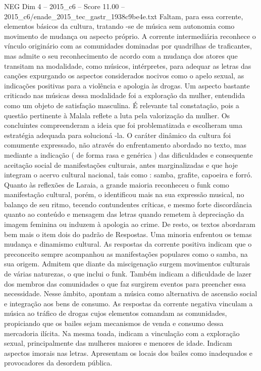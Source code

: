 \begin{textsample}{NEG Dim 4 – 2015\_c6 – Score 11.00 – 2015\_c6/enade\_2015\_tec\_gastr\_1938c9be4e.txt}
Faltam, para essa corrente, elementos básicos da cultura, tratando -se de música sem autonomia como movimento de mudança ou aspecto próprio.
A corrente intermediária reconhece o vínculo originário com as comunidades dominadas por quadrilhas de traficantes, mas admite o seu reconhecimento de acordo com a mudança dos atores que transitam na modalidade, como músicos, intérpretes, para adequar as letras das canções expurgando os aspectos considerados nocivos como o apelo sexual, as indicações positivas para a violência e apologia às drogas.
Um aspecto bastante criticado nas músicas dessa modalidade foi a exploração da mulher, entendida como um objeto de satisfação masculina.
É relevante tal constatação, pois a questão pertinente à Malala reflete a luta pela valorização da mulher.
Os concluintes compreenderam a ideia que foi problematizada e escolheram uma estratégia adequada para solucioná -la.
O caráter dinâmico da cultura foi comumente expressado, não através do enfrentamento abordado no texto, mas mediante a indicação ( de forma rasa e genérica ) das dificuldades e consequente aceitação social de manifestações culturais, antes marginalizadas e que hoje integram o acervo cultural nacional, tais como : samba, grafite, capoeira e forró.
Quanto às reflexões de Laraia, a grande maioria reconheceu o funk como manifestação cultural, porém, o identificou mais na sua expressão musical, no balanço de seu ritmo, tecendo contundentes críticas, e mesmo forte discordância quanto ao conteúdo e mensagem das letras quando remetem à depreciação da imagem feminina ou induzem à apologia ao crime.
De resto, os textos abordaram bem mais o item dois do padrão de Respostas.
Uma minoria enfrentou os temas mudança e dinamismo cultural.
As respostas da corrente positiva indicam que o preconceito sempre acompanhou as manifestações populares como o samba, na sua origem.
Admitem que diante da miscigenação surgem movimentos culturais de várias naturezas, o que inclui o funk.
Também indicam a dificuldade de lazer dos membros das comunidades o que faz surgirem eventos para preencher essa necessidade.
Nesse âmbito, apontam a música como alternativa de ascensão social e integração aos bens de consumo.
As respostas da corrente negativa vinculam a música ao tráfico de drogas cujos elementos comandam as comunidades, propiciando que os bailes sejam mecanismos de venda e consumo dessa mercadoria ilícita.
Na mesma toada, indicam a vinculação com a exploração sexual, principalmente das mulheres maiores e menores de idade.
Indicam aspectos imorais nas letras.
Apresentam os locais dos bailes como inadequados e provocadores da desordem pública.

\end{textsample}
